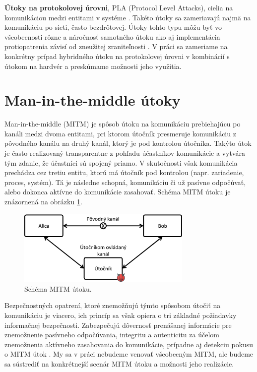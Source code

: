 \textbf{Útoky na protokolovej úrovni}, PLA (Protocol Level Attacks), cielia na komunikáciou medzi entitami v systéme \cite{mitmPCIe}. Takéto útoky sa zameriavajú najmä na komunikáciu po sieti, často bezdrôtovej. Útoky tohto typu môžu byť vo všeobecnosti rôzne a náročnosť samotného útoku ako aj implementácia protiopatrenia závisí od zneužitej zraniteľnosti \cite{mitmPCIe}. V práci sa zameriame na konkrétny prípad hybridného útoku na protokolovej úrovni v kombinácií s útokom na hardvér a preskúmame možnosti jeho využitia.

\section{Man-in-the-middle útoky} \label{kap1:sek:mitm}
Man-in-the-middle (MITM) je spôsob útoku na komunikáciu prebiehajúcu po kanáli medzi dvoma entitami, pri ktorom útočník presmeruje komunikáciu z pôvodného kanálu na druhý kanál, ktorý je pod kontrolou útočníka. Takýto útok je často realizovaný transparentne z pohľadu účastníkov komunikácie  a vytvára tým zdanie, že účastníci sú spojený priamo. V skutočnosti však komunikácia prechádza cez tretiu entitu, ktorú má útočník pod kontrolou (napr. zariadenie, proces, systém). Tá je následne schopná, komunikáciu či už pasívne odpočúvať, alebo dokonca aktívne do komunikácie zasahovať. Schéma MITM útoku je znázornená na obrázku \ref{obr:mitm}.

\begin{figure}
    \centerline{\includegraphics[width=0.75\textwidth]{images/mitm.png}}
    \caption[Schéma MITM útoku]{Schéma MITM útoku.}
    \label{obr:mitm}
\end{figure}

Bezpečnostných opatrení, ktoré znemožňujú týmto spôsobom útočiť na komunikáciu je viacero, ich princíp sa však opiera o tri základné požiadavky informačnej bezpečnosti. Zabezpečujú dôvernosť prenášanej informácie pre znemožnenie pasívneho odpočúvania, integritu a autenticitu za účelom znemožnenia aktívneho zasahovania do komunikácie, prípadne aj detekciu pokusu o MITM útok \cite{mitmTheory}. My sa v práci nebudeme venovať všeobecným MITM, ale budeme sa sústrediť na konkrétnejší scenár MITM útoku a možnosti jeho realizácie.


